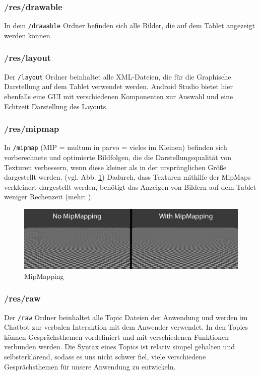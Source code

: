 \subsubsection*{/res/drawable}
In dem \verb|/drawable| Ordner befinden sich alle Bilder, die auf dem Tablet angezeigt werden können.

\subsubsection*{/res/layout}
Der \verb|/layout| Ordner beinhaltet alle XML-Dateien, die für die Graphische Darstellung auf dem Tablet verwendet werden. Android 
Studio bietet hier ebenfalls eine GUI mit verschiedenen Komponenten zur Auswahl und eine Echtzeit Darstellung des Layouts.

\subsubsection*{/res/mipmap}
In \verb|/mipmap| (MIP = multum in parvo = vieles im Kleinen) befinden sich vorberechnete und optimierte Bildfolgen, die die Darstellungsqualität von Texturen verbessern, wenn diese kleiner als in der ursprünglichen Größe dargestellt werden. (vgl. Abb. \ref{fig:MipMap}) Dadurch, dass Texturen mithilfe der MipMaps verkleinert dargestellt werden, benötigt das Anzeigen von Bildern auf dem Tablet weniger Rechenzeit (mehr: \cite{MipMaps}).

\begin{figure}[H]
    \includegraphics[width=\textwidth]{Figures/AppChapter/4_1_2.png}
    \caption{MipMapping \cite{mimappng}}
    \label{fig:MipMap}
    \centering
\end{figure}

\subsubsection*{/res/raw}
Der \verb|/raw| Ordner beinhaltet alle Topic Dateien der Anwendung und werden im Chatbot zur verbalen Interaktion mit dem Anwender verwendet. In den Topics können Gesprächsthemen vordefiniert und mit verschiedenen Funktionen verbunden werden. Die Syntax eines Topics ist relativ simpel gehalten und selbsterklärend, sodass es uns nicht schwer fiel, viele verschiedene Gesprächsthemen für unsere Anwendung zu entwickeln.

